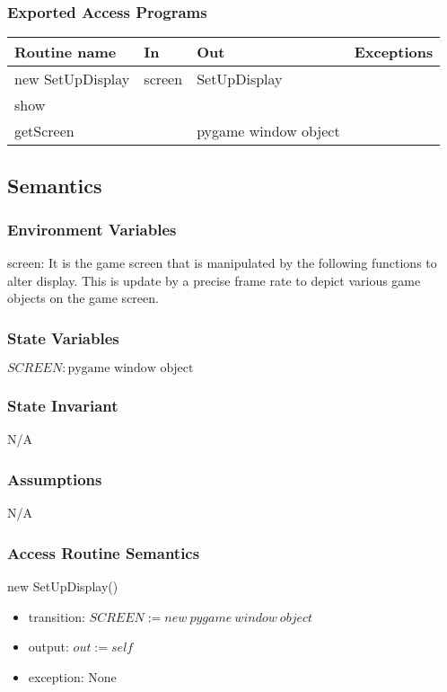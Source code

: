 \documentclass[12pt]{article}
\begin{document}
\subsubsection*{Exported Access Programs}
\begin{tabular}{| l | l | l | l |}
\hline
\textbf{Routine name} & \textbf{In} & \textbf{Out} & \textbf{Exceptions}\\
\hline
new SetUpDisplay       &      screen     &     SetUpDisplay        &           \\
\hline
show       &	   &           &          \\
\hline
getScreen      &	   &pygame window  object&          \\
\hline
\end{tabular}

\subsection*{Semantics}
\subsubsection*{Environment Variables}
screen: It is the game screen that is manipulated by the following functions to alter display. This is update by a precise frame rate to depict various game objects on the game screen.

\subsubsection*{State Variables}
$SCREEN : \text{pygame window object}$
\subsubsection*{State Invariant}
N/A
\subsubsection*{Assumptions}
N/A
\subsubsection*{Access Routine Semantics}

new SetUpDisplay()
\begin{itemize}
    \item transition: $SCREEN := new\ pygame\ window\ object$
    \item output: $out := self$
    \item exception: None
\end{itemize}
\end{document}
